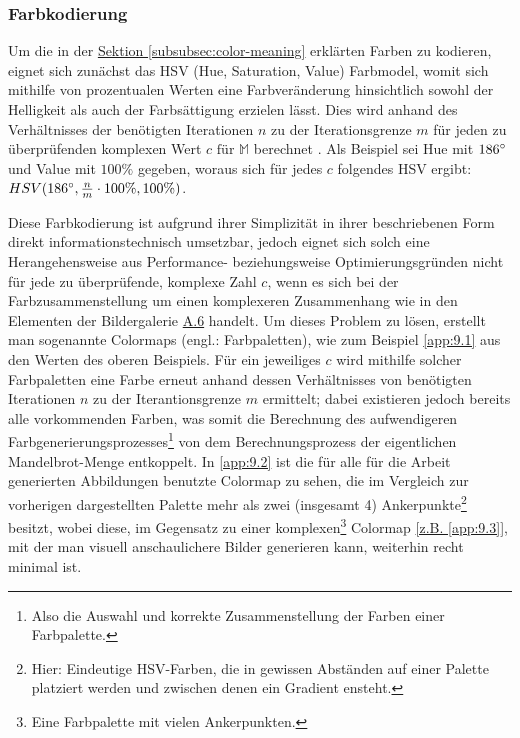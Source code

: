 \subsubsection{Farbkodierung}\label{subsubsec:color-coding}

Um die in der \hyperref[subsubsec:color-meaning]{Sektion \ref{subsubsec:color-meaning}}
erklärten Farben zu kodieren, eignet sich zunächst das HSV (Hue, Saturation, Value)
Farbmodel, womit sich mithilfe von prozentualen Werten eine
Farbveränderung hinsichtlich sowohl der Helligkeit
als auch der Farbsättigung erzielen lässt.
Dies wird anhand des Verhältnisses der benötigten Iterationen $n$ zu der Iterationsgrenze $m$
für jeden zu überprüfenden komplexen Wert $c \text{ für } \mathbb{M}$
berechnet \cite{robert_p_color_2022}.
Als Beispiel sei Hue mit $186\degree$ und Value mit $100\%$ gegeben, woraus
sich für jedes $c$ folgendes HSV ergibt:
$ HSV(186\degree, \frac{n}{m} \cdot 100\%, 100\%)$.

Diese Farbkodierung ist aufgrund ihrer Simplizität in ihrer beschriebenen
Form direkt informationstechnisch umsetzbar, jedoch eignet sich solch eine
Herangehensweise aus Performance- beziehungsweise Optimierungsgründen nicht
für jede zu überprüfende, komplexe Zahl $c$, wenn es sich bei der
Farbzusammenstellung um einen komplexeren Zusammenhang wie in den Elementen
der Bildergalerie \hyperref[app:6]{A.6} handelt.
Um dieses Problem zu lösen, erstellt man sogenannte Colormaps
(engl.: Farbpaletten), wie zum Beispiel \hyperref[app:9.1]{\ref{app:9.1}}
aus den Werten des oberen Beispiels.
Für ein jeweiliges $c$ wird mithilfe solcher Farbpaletten eine Farbe erneut anhand
dessen Verhältnisses von benötigten Iterationen $n$ zu der Iterantionsgrenze $m$
ermittelt; dabei existieren jedoch bereits alle vorkommenden Farben, was somit
die Berechnung des aufwendigeren Farbgenerierungsprozesses\footnote{
  Also die Auswahl und korrekte Zusammenstellung der Farben einer Farbpalette.
}
von dem Berechnungsprozess der eigentlichen Mandelbrot-Menge entkoppelt.
In \hyperref[app:9.2]{\ref{app:9.2}} ist die für alle für die Arbeit generierten
Abbildungen benutzte Colormap zu sehen, die im Vergleich zur vorherigen
dargestellten Palette mehr als zwei (insgesamt 4) Ankerpunkte\footnote{
  Hier: Eindeutige HSV-Farben, die in gewissen Abständen auf einer Palette
  platziert werden und zwischen denen ein Gradient ensteht.
} besitzt, wobei diese, im Gegensatz zu einer komplexen\footnote{
  Eine Farbpalette mit vielen Ankerpunkten.
} Colormap \hyperref[app:9.3]{[z.B. \ref{app:9.3}]},
mit der man visuell anschaulichere Bilder generieren kann,
weiterhin recht minimal ist.